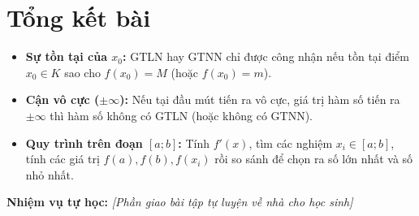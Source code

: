 \documentclass[12pt]{article}
\begin{document}
	\newpage
	
	\section{Tổng kết bài}
	
	\begin{tcolorbox}[colback=yellow!10!white, colframe=orange!60!black,
		fonttitle=\bfseries, title={Quy tắc sống còn khi tìm GTLN, GTNN}]
		\begin{itemize}
			\item \textbf{Sự tồn tại của $x_0$:} GTLN hay GTNN chỉ được công nhận nếu tồn tại điểm $x_0 \in K$ sao cho $f(x_0) = M$ (hoặc $f(x_0) = m$).
			\item \textbf{Cận vô cực ($\pm\infty$):} Nếu tại đầu mút tiến ra vô cực, giá trị hàm số tiến ra $\pm\infty$ thì hàm số không có GTLN (hoặc không có GTNN).
			\item \textbf{Quy trình trên đoạn $[a;b]$:} Tính $f'(x)$, tìm các nghiệm $x_i \in [a;b]$, tính các giá trị $f(a), f(b), f(x_i)$ rồi so sánh để chọn ra số lớn nhất và số nhỏ nhất.
		\end{itemize}
	\end{tcolorbox}
	
	\vspace{3mm}
	\textbf{Nhiệm vụ tự học:} \textit{[Phần giao bài tập tự luyện về nhà cho học sinh]}
	
\end{document}
